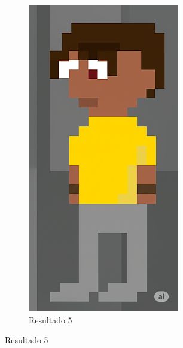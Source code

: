 \begin{figure}[htbp]
\begin{subfigure}{0.23\linewidth}
        \includegraphics[width=1\linewidth]{figs/geminiPro/chat11/1res5.PNG}
        \caption{\small Resultado 5}
        \label{fig:geminiPro15e}
    \end{subfigure}
\end{figure}

